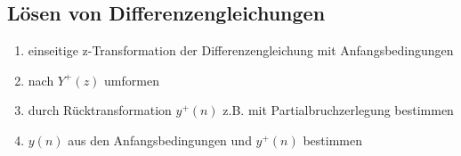 \documentclass[10pt,a4paper]{article}
\begin{document}
\subsection*{Lösen von Differenzengleichungen}
\begin{enumerate}
	\item einseitige z-Transformation der Differenzengleichung mit Anfangsbedingungen
	\item nach $Y^{+}(z)$ umformen
	\item durch Rücktransformation $y^{+}(n)$ z.B. mit  Partialbruchzerlegung bestimmen
	\item  $y(n)$ aus den Anfangsbedingungen und $y^{+}(n)$  bestimmen
\end{enumerate}
\end{document}
